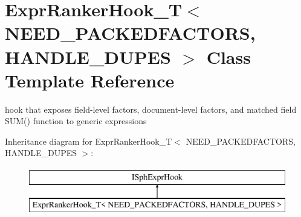 \hypertarget{classExprRankerHook__T}{\section{Expr\-Ranker\-Hook\-\_\-\-T$<$ N\-E\-E\-D\-\_\-\-P\-A\-C\-K\-E\-D\-F\-A\-C\-T\-O\-R\-S, H\-A\-N\-D\-L\-E\-\_\-\-D\-U\-P\-E\-S $>$ Class Template Reference}
\label{classExprRankerHook__T}
}


hook that exposes field-\/level factors, document-\/level factors, and matched field S\-U\-M() function to generic expressions  


Inheritance diagram for Expr\-Ranker\-Hook\-\_\-\-T$<$ N\-E\-E\-D\-\_\-\-P\-A\-C\-K\-E\-D\-F\-A\-C\-T\-O\-R\-S, H\-A\-N\-D\-L\-E\-\_\-\-D\-U\-P\-E\-S $>$\-:\begin{figure}[H]
\begin{center}
\leavevmode
\includegraphics[height=2.000000cm]{classExprRankerHook__T}
\end{center}
\end{figure}
